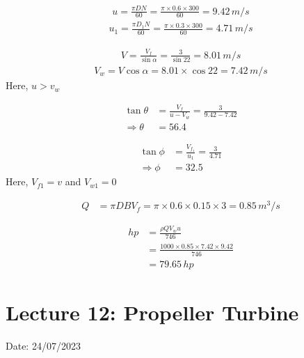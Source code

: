 \documentclass{article}
\begin{document}
\begin{multicols}{2}
\begin{align*}
  u = \frac{\pi D N}{60} = \frac{\pi \times 0.6 \times 300}{60} = 9.42 \, m/s 
\end{align*}
\begin{align*}
  u_1 = \frac{\pi D_1 N}{60} = \frac{\pi \times 0.3 \times 300}{60} = 4.71 \, m/s 
\end{align*}

\begin{align*}
  V = \frac{V_f}{\sin \alpha} = \frac{3}{\sin 22} = 8.01 \, m/s 
\end{align*}
\begin{align*}
  V_w = V \cos \alpha = 8.01 \times \cos 22 = 7.42 \, m/s 
\end{align*}
Here, $u>v_w$

\begin{align*}
  \tan \theta &= \frac{V_f}{u-V_w} = \frac{3}{9.42-7.42}\\
  \Rightarrow \theta &= 56.4
\end{align*}

\begin{align*}
  \tan \phi &= \frac{V_{f_1}}{u_1} = \frac{3}{4.71} \\
  \Rightarrow \phi &= 32.5
\end{align*}
Here, $V_{f1} = v$ and $V_{w1}=0$

\begin{align*}
  Q &= \pi D B V_f = \pi \times 0.6 \times 0.15 \times 3 = 0.85 \, m^3/s
\end{align*}

\begin{align*}
  hp &= \frac{\rho Q V_w u}{746} \\
  &= \frac{1000 \times 0.85 \times 7.42 \times 9.42}{746}\\
  &= 79.65 \, hp
\end{align*}

\end{multicols}

\section{Lecture 12: Propeller Turbine}
\hfill Date: 24/07/2023
\end{document}
